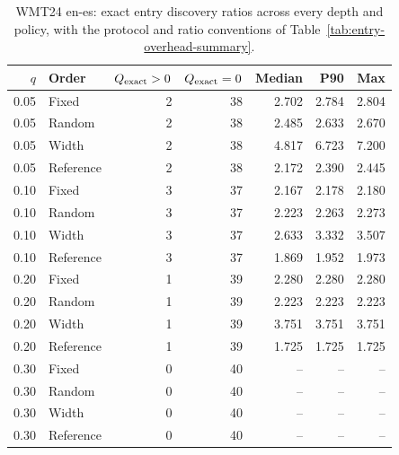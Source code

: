 \begin{table}[t]
\centering\small


\begin{tabular}{rlrrrrr}
\toprule
$q$ & Order & $Q_{\rm exact}>0$ & $Q_{\rm exact}=0$ & Median & P90 & Max \\
\midrule
0.05 & Fixed & 2 & 38 & 2.702 & 2.784 & 2.804 \\
0.05 & Random & 2 & 38 & 2.485 & 2.633 & 2.670 \\
0.05 & Width & 2 & 38 & 4.817 & 6.723 & 7.200 \\
0.05 & Reference & 2 & 38 & 2.172 & 2.390 & 2.445 \\
0.10 & Fixed & 3 & 37 & 2.167 & 2.178 & 2.180 \\
0.10 & Random & 3 & 37 & 2.223 & 2.263 & 2.273 \\
0.10 & Width & 3 & 37 & 2.633 & 3.332 & 3.507 \\
0.10 & Reference & 3 & 37 & 1.869 & 1.952 & 1.973 \\
0.20 & Fixed & 1 & 39 & 2.280 & 2.280 & 2.280 \\
0.20 & Random & 1 & 39 & 2.223 & 2.223 & 2.223 \\
0.20 & Width & 1 & 39 & 3.751 & 3.751 & 3.751 \\
0.20 & Reference & 1 & 39 & 1.725 & 1.725 & 1.725 \\
0.30 & Fixed & 0 & 40 & -- & -- & -- \\
0.30 & Random & 0 & 40 & -- & -- & -- \\
0.30 & Width & 0 & 40 & -- & -- & -- \\
0.30 & Reference & 0 & 40 & -- & -- & -- \\
\bottomrule
\end{tabular}
\caption{WMT24 en-es: exact entry discovery ratios across every depth and policy, with the protocol and ratio conventions of Table~\ref{tab:entry-overhead-summary}.}
\label{tab:entry-overhead-all-4}
\end{table}
